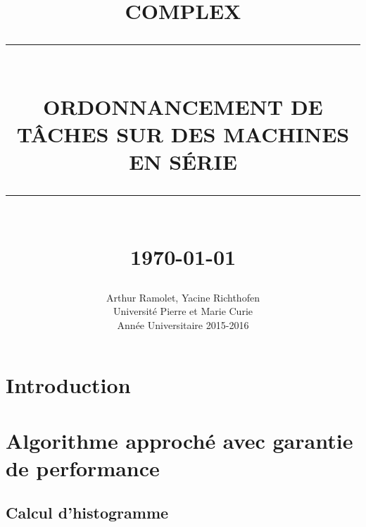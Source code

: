 \documentclass[12pt]{article}
\newcommand{\HRule}[1]{\rule{\linewidth}{#1}}
\begin{document}
\title{ \normalsize \textsc{COMPLEX}
		\\ [2.0cm]
		\HRule{0.5pt} \\
		\LARGE \textbf{\uppercase{Ordonnancement de tâches sur des machines en série}}
		\HRule{2pt} \\ [0.5cm]
		\normalsize \today \vspace*{5\baselineskip}}

\date{}

\author{
		Arthur Ramolet, Yacine Richthofen \\ 
		Université Pierre et Marie Curie \\
		Année Universitaire 2015-2016 }

\maketitle

\newpage
\tableofcontents

\newpage
\sectionfont{\scshape}



\section{Introduction}




\section{Algorithme approché avec garantie de performance}



\subsection{Calcul d'histogramme}
\end{document}
